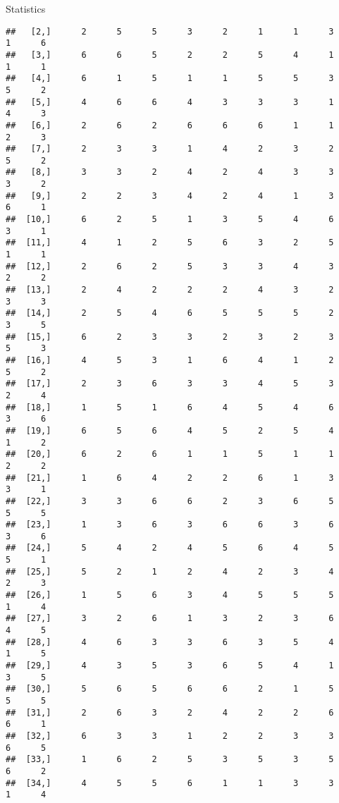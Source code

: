 \documentclass[
  ignorenonframetext,
]{beamer}
\begin{document}
\begin{frame}[fragile]{Statistics}
\begin{verbatim}
##   [2,]      2      5      5      3      2      1      1      3      1      6
##   [3,]      6      6      5      2      2      5      4      1      1      1
##   [4,]      6      1      5      1      1      5      5      3      5      2
##   [5,]      4      6      6      4      3      3      3      1      4      3
##   [6,]      2      6      2      6      6      6      1      1      2      3
##   [7,]      2      3      3      1      4      2      3      2      5      2
##   [8,]      3      3      2      4      2      4      3      3      3      2
##   [9,]      2      2      3      4      2      4      1      3      6      1
##  [10,]      6      2      5      1      3      5      4      6      3      1
##  [11,]      4      1      2      5      6      3      2      5      1      1
##  [12,]      2      6      2      5      3      3      4      3      2      2
##  [13,]      2      4      2      2      2      4      3      2      3      3
##  [14,]      2      5      4      6      5      5      5      2      3      5
##  [15,]      6      2      3      3      2      3      2      3      5      3
##  [16,]      4      5      3      1      6      4      1      2      5      2
##  [17,]      2      3      6      3      3      4      5      3      2      4
##  [18,]      1      5      1      6      4      5      4      6      3      6
##  [19,]      6      5      6      4      5      2      5      4      1      2
##  [20,]      6      2      6      1      1      5      1      1      2      2
##  [21,]      1      6      4      2      2      6      1      3      3      1
##  [22,]      3      3      6      6      2      3      6      5      5      5
##  [23,]      1      3      6      3      6      6      3      6      3      6
##  [24,]      5      4      2      4      5      6      4      5      5      1
##  [25,]      5      2      1      2      4      2      3      4      2      3
##  [26,]      1      5      6      3      4      5      5      5      1      4
##  [27,]      3      2      6      1      3      2      3      6      4      5
##  [28,]      4      6      3      3      6      3      5      4      1      5
##  [29,]      4      3      5      3      6      5      4      1      3      5
##  [30,]      5      6      5      6      6      2      1      5      5      5
##  [31,]      2      6      3      2      4      2      2      6      6      1
##  [32,]      6      3      3      1      2      2      3      3      6      5
##  [33,]      1      6      2      5      3      5      3      5      6      2
##  [34,]      4      5      5      6      1      1      3      3      1      4

\end{verbatim}
\end{frame}
\end{document}

